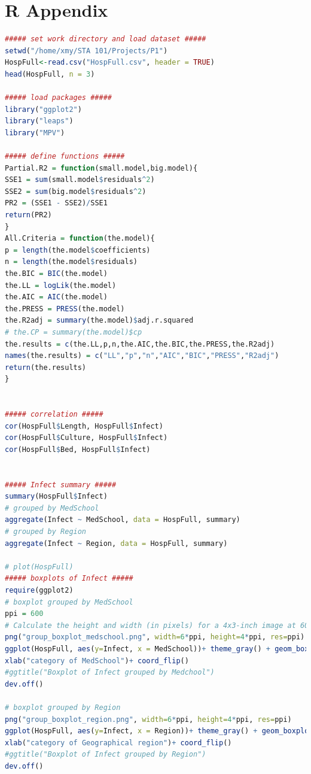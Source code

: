 \documentclass[a4paper,11pt,onecolumn,twoside]{article}
\begin{document}
\section*{R Appendix}				
\begin{lstlisting}[language=R,caption={R script for Project 1}] 
##### set work directory and load dataset ##### 
setwd("/home/xmy/STA 101/Projects/P1")
HospFull<-read.csv("HospFull.csv", header = TRUE)
head(HospFull, n = 3)

##### load packages #####
library("ggplot2")
library("leaps")
library("MPV")

##### define functions #####
Partial.R2 = function(small.model,big.model){
SSE1 = sum(small.model$residuals^2)
SSE2 = sum(big.model$residuals^2)
PR2 = (SSE1 - SSE2)/SSE1
return(PR2)
}
All.Criteria = function(the.model){
p = length(the.model$coefficients)
n = length(the.model$residuals)
the.BIC = BIC(the.model)
the.LL = logLik(the.model)
the.AIC = AIC(the.model)
the.PRESS = PRESS(the.model)
the.R2adj = summary(the.model)$adj.r.squared
# the.CP = summary(the.model)$cp
the.results = c(the.LL,p,n,the.AIC,the.BIC,the.PRESS,the.R2adj)
names(the.results) = c("LL","p","n","AIC","BIC","PRESS","R2adj")
return(the.results)
}


##### correlation #####
cor(HospFull$Length, HospFull$Infect)
cor(HospFull$Culture, HospFull$Infect)
cor(HospFull$Bed, HospFull$Infect)


##### Infect summary #####
summary(HospFull$Infect)
# grouped by MedSchool
aggregate(Infect ~ MedSchool, data = HospFull, summary)
# grouped by Region
aggregate(Infect ~ Region, data = HospFull, summary)

# plot(HospFull)
##### boxplots of Infect #####
require(ggplot2)
# boxplot grouped by MedSchool
ppi = 600
# Calculate the height and width (in pixels) for a 4x3-inch image at 600 ppi
png("group_boxplot_medschool.png", width=6*ppi, height=4*ppi, res=ppi)
ggplot(HospFull, aes(y=Infect, x = MedSchool))+ theme_gray() + geom_boxplot() + ylab("Probability of acquiring infection in hospital") + 
xlab("category of MedSchool")+ coord_flip() 
#ggtitle("Boxplot of Infect grouped by Medchool") 
dev.off()

# boxplot grouped by Region
png("group_boxplot_region.png", width=6*ppi, height=4*ppi, res=ppi)
ggplot(HospFull, aes(y=Infect, x = Region))+ theme_gray() + geom_boxplot() + ylab("Probability of acquiring infection in hospital") + 
xlab("category of Geographical region")+ coord_flip() 
#ggtitle("Boxplot of Infect grouped by Region") 
dev.off()



\end{lstlisting}
\end{document}
